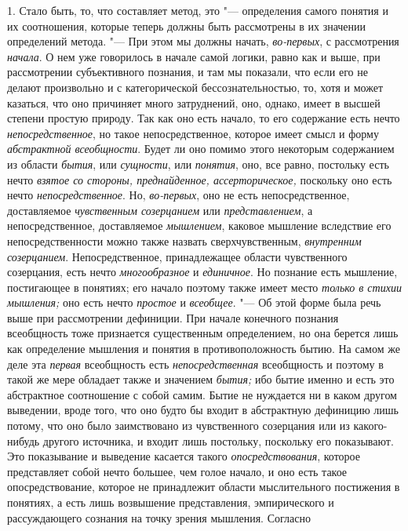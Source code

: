 1. Стало быть, то, что составляет метод, это
"--- определения самого понятия и их соотношения, которые теперь
должны быть рассмотрены в их значении определений метода. "---
При этом мы должны начать, {\em во-первых}, с рассмотрения {\em начала}.
О нем уже говорилось в начале самой логики, равно как и выше,
при рассмотрении субъективного познания, и там мы показали, что если его не
делают произвольно и с категорической бессознательностью, то, хотя и может
казаться, что оно причиняет много затруднений, оно, однако,
имеет в высшей степени простую природу. Так как оно есть начало, то его
содержание есть нечто {\em непосредственное},
но такое непосредственное, которое имеет смысл и форму
{\em абстрактной всеобщности}.
Будет ли оно помимо этого некоторым содержанием из области
{\em бытия}, или {\em сущности}, или {\em понятия}, оно, все
равно, постольку есть нечто {\em взятое
со стороны, преднайденное, ассерторическое,} поскольку оно
есть нечто {\em непосредственное}. Но, {\em во-первых},
оно не есть непосредственное, доставляемое
{\em чувственным созерцанием} или {\em представлением},
а непосредственное, доставляемое {\em мышлением}, каковое
мышление вследствие его непосредственности можно также назвать
сверхчувственным, {\em внутренним
созерцанием}. Непосредственное, принадлежащее области
чувственного созерцания, есть нечто
{\em многообразное} и {\em единичное}. Но
познание есть мышление, постигающее в понятиях; его начало поэтому также
имеет место {\em только в стихии
мышления;} оно есть нечто {\em простое} и {\em всеобщее}. "--- Об этой
форме была речь выше при рассмотрении дефиниции. При начале конечного
познания всеобщность тоже признается существенным определением, но она
берется лишь как определение мышления и понятия в противоположность бытию.
На самом же деле эта {\em первая} всеобщность есть {\em непосредственная}
всеобщность и поэтому в такой же мере обладает также и значением {\em бытия;}
ибо бытие именно и есть это абстрактное соотношение с собой
самим. Бытие не нуждается ни в каком другом выведении, вроде того, что оно
будто бы входит в абстрактную дефиницию лишь потому, что оно было
заимствовано из чувственного созерцания или из какого-нибудь другого
источника, и входит лишь постольку, поскольку его показывают. Это
показывание и выведение касается такого {\em опосредствования},
которое представляет собой нечто большее, чем голое начало, и
оно есть такое опосредствование, которое не принадлежит области
мыслительного постижения в понятиях, а есть лишь возвышение представления,
эмпирического и рассуждающего сознания на точку зрения мышления. Согласно
